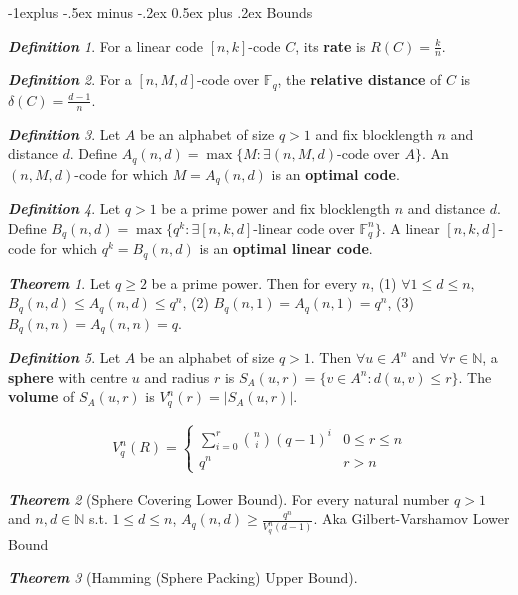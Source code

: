 \documentclass[frenchspacing,9pt,landscape,a4paper]{article}
\makeatletter
\renewcommand{\subsection}{\@startsection{subsection}{2}{0mm}%
                                {-1explus -.5ex minus -.2ex}%
                                {0.5ex plus .2ex}%
                                {\normalfont\normalsize\bfseries}}
\newcommand{\BF}{\mathbb F}
\newcommand{\BN}{\mathbb N}
\newcommand{\tb}[1]{\textbf {#1}}
\newcommand{\abs}[1]{\left\lvert #1 \right\rvert}
\theoremstyle{remark}
\newtheorem*{thm}{\textbf{Theorem}}
\newtheorem*{defn}{\textbf{Definition}}
\makeatother
\begin{document}
\begin{multicols}{4}
\subsection{Bounds}
\begin{defn}
    For a linear code $[n,k]$-code $C$, its \tb{rate} is $R(C)=\frac{k}{n}$.
\end{defn}
\begin{defn}
    For a $[n,M,d]$-code over  $\BF_q$, the \tb{relative distance} of $C$ is  $\delta(C)=\frac{d-1}{n}$.
\end{defn}
\begin{defn}
    Let $A$ be an alphabet of size  $q>1$ and fix blocklength  $n$ and distance  $d$. Define
    $A_q(n,d)=\max\{M:\exists(n,M,d)\text{-code over $A$}\}$. An $(n,M,d)$-code for which  $M=A_q(n,d)$ is
    an \tb{optimal code}.
\end{defn}
\begin{defn}
    Let $q>1$ be a prime power and fix blocklength  $n$ and distance  $d$. Define
    $B_q(n,d)=\max\{q^k:\exists [n,k,d]\text{-linear code over $\BF_q^n$}\}$. A linear $[n,k,d]$-code for
    which  $q^k=B_q(n,d)$ is an \tb{optimal linear code}.
\end{defn}
\begin{thm}
    Let $q\geq 2$ be a prime power. Then for every  $n$, (1)  $\forall 1\leq d\leq n$,  $B_q(n,d)\leq
    A_q(n,d)\leq q^n$, (2)  $B_q(n,1)=A_q(n,1)=q^n$, (3)  $B_q(n,n)=A_q(n,n)=q$.
\end{thm}
\begin{defn}
    Let $A$ be an alphabet of size  $q>1$. Then  $\forall u\in A^n$ and  $\forall r\in\BN$, a \tb{sphere}
    with centre  $u$ and radius  $r$  is $S_A(u,r)=\{v\in A^n:d(u,v)\leq r\}$. The \tb{volume} of
    $S_A(u,r)$ is  $V_q^n(r)=\abs{S_A(u,r)}$.
\end{defn}
    \begin{align*}
        V_q^n(R)=
        \begin{cases}
            \sum_{i=0}^r\binom{n}{i}(q-1)^i & 0\leq r\leq n\\
            q^n & r>n
        \end{cases}
    \end{align*}
\begin{thm}[Sphere Covering Lower Bound]
    For every natural number $q>1$ and  $n,d\in\BN$ s.t.  $1\leq d\leq n$,  $A_q(n,d)\geq
    \frac{q^n}{V_q^n(d-1)}$. Aka Gilbert-Varshamov Lower Bound
\end{thm}
\begin{thm}[Hamming (Sphere Packing) Upper Bound]

\end{thm}
\end{multicols}
\end{document}
